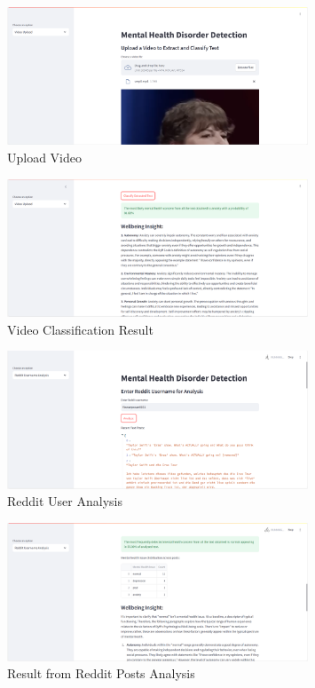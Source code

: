 \begin{figure}[h!]  
    \centering
    \includegraphics[width=0.8\textwidth]{App Images/12 Interface.png}  
    \caption{Upload Video}
    \label{06i4}  %
\end{figure}

\begin{figure}[h!]  
    \centering
    \includegraphics[width=0.8\textwidth]{App Images/13 Interface.png}  
    \caption{Video Classification Result}
    \label{06i}  %
\end{figure}

\begin{figure}[h!]  
    \centering
    \includegraphics[width=0.8\textwidth]{App Images/06 Interface.png}  
    \caption{Reddit User Analysis}
    \label{07i}  %
\end{figure}

\begin{figure}[h!]  
    \centering
    \includegraphics[width=0.8\textwidth]{App Images/07 Interface.png}  
    \caption{Result from Reddit Posts Analysis}
    \label{08i}  %
\end{figure}


